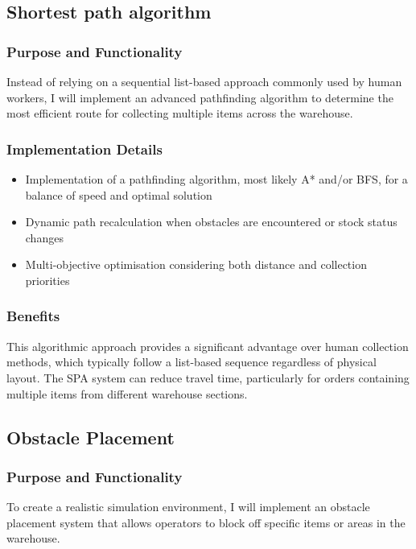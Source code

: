 \subsection{Shortest path algorithm}

\subsubsection{Purpose and Functionality}
Instead of relying on a sequential list-based approach commonly used by human workers, I will implement an advanced pathfinding algorithm to determine the most efficient route for collecting multiple items across the warehouse.

\subsubsection{Implementation Details}
\begin{itemize}
    \item Implementation of a pathfinding algorithm, most likely A* and/or BFS, for a balance of speed and optimal solution
    \item Dynamic path recalculation when obstacles are encountered or stock status changes
    \item Multi-objective optimisation considering both distance and collection priorities
\end{itemize}

\subsubsection{Benefits}
This algorithmic approach provides a significant advantage over human collection methods, which typically follow a list-based sequence regardless of physical layout. The SPA system can reduce travel time, particularly for orders containing multiple items from different warehouse sections.

\newpage

\subsection{Obstacle Placement}

\subsubsection{Purpose and Functionality}
To create a realistic simulation environment, I will implement an obstacle placement system that allows operators to block off specific items or areas in the warehouse.

